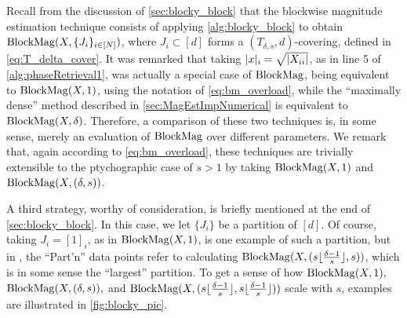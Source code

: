 Recall from the discussion of \cref{sec:blocky_block} that the blockwise magnitude estimation technique consists of applying \cref{alg:blocky_block} to obtain $\operatorname{BlockMag}(X, \{J_i\}_{i \in [N]})$, where $J_i \subset [d]$ forms a $(T_{\delta, s}, d)$-covering, defined in \cref{eq:T_delta_cover}.  It was remarked that taking $\lvert x\rvert_i = \sqrt{\lvert X_{ii}\rvert}$, as in line 5 of \cref{alg:phaseRetrieval1}, was actually a special case of $\operatorname{BlockMag}$, being equivalent to $\operatorname{BlockMag}(X, 1)$, using the notation of \cref{eq:bm_overload}, while the ``maximally dense'' method described in \cref{sec:MagEstImpNumerical} is equivalent to $\operatorname{BlockMag}(X, \delta)$.  Therefore, a comparison of these two techniques is, in some sense, merely an evaluation of $\operatorname{BlockMag}$ over different parameters.  We remark that, again according to \eqref{eq:bm_overload}, these techniques are trivially extensible to the ptychographic case of $s > 1$ by taking $\operatorname{BlockMag}(X, 1)$ and $\operatorname{BlockMag}(X, (\delta, s))$.

A third strategy, worthy of consideration, is briefly mentioned at the end of \cref{sec:blocky_block}.  In this case, we let $\{J_i\}$ be a partition of $[d]$.  Of course, taking $J_i = [1]_i$, as in $\operatorname{BlockMag}(X, 1)$, is one example of such a partition, but in , the ``Part'n'' data points refer to calculating $\operatorname{BlockMag}(X, (s\lfloor\frac{\delta - 1}{s}\rfloor, s))$, which is in some sense the ``largest'' partition.  To get a sense of how $\operatorname{BlockMag}(X, 1),$ $\operatorname{BlockMag}(X, (\delta, s)),$ and $\operatorname{BlockMag}(X, (s\lfloor\frac{\delta - 1}{s}\rfloor, s\lfloor\frac{\delta - 1}{s}\rfloor))$ scale with $s$, examples are illustrated in \cref{fig:blocky_pic}.

